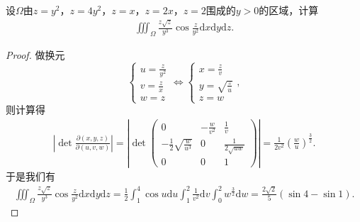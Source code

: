 \documentclass[../../main.tex]{subfiles}%
\begin{document}
\begin{example}
设$\Omega$由$z=y^2$，$z=4y^2$，$z=x$，$z=2x$，$z=2$围成的$y>0$的区域，计算
\begin{align*}
\iiint_{\Omega}\frac{z\sqrt{z}}{y^3}\cos\frac{z}{y^2}\mathrm{d}x\mathrm{d}y\mathrm{d}z.
\end{align*}
\end{example}

\begin{proof}
做换元
\[
\begin{cases}
u=\displaystyle\frac{z}{y^2}\\[4pt]
v=\displaystyle\frac{z}{x}\\[4pt]
w=z
\end{cases}
\iff
\begin{cases}
x=\displaystyle\frac{z}{v}\\[4pt]
y=\displaystyle\sqrt{\frac{z}{u}}\\[4pt]
z=w
\end{cases},
\]
则计算得
\begin{align*}
\left|\det \frac{\partial(x,y,z)}{\partial(u,v,w)}\right|
=\left|\det \begin{pmatrix}
0 & -\displaystyle\frac{w}{v^2} & \displaystyle\frac{1}{v}\\[6pt]
-\displaystyle\frac12\sqrt{\frac{w}{u^3}} & 0 & \displaystyle\frac{1}{2\sqrt{uw}}\\[6pt]
0 & 0 & 1
\end{pmatrix}\right|
=\frac{1}{2v^2}\left(\frac{w}{u}\right)^{\frac32}.
\end{align*}
于是我们有
\begin{align*}
\iiint_{\Omega}\frac{z\sqrt{z}}{y^3}\cos\frac{z}{y^2}\mathrm{d}x\mathrm{d}y\mathrm{d}z
=\frac12\int_{1}^{4}\cos u\mathrm{d}u\int_{1}^{2}\frac{1}{v^2}\mathrm{d}v\int_{0}^{2}w^{\frac32}\mathrm{d}w
=\frac{2\sqrt{2}}{5}(\sin4-\sin1).
\end{align*}\end{proof}
\end{document}
